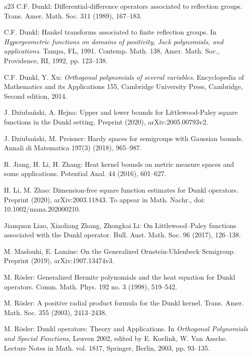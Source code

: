\documentclass[11pt,a4paper]{article}
\theoremstyle{definition}\newtheorem{remark}[theorem]{Remark}
\begin{document}
\begin{thebibliography}{a23}
C.F. Dunkl: Differential-difference operators associated to reflection groups. Trans. Amer. Math. Soc. 311 (1989), 167--183.

C.F. Dunkl: Hankel transforms associated to finite reflection groups. In \emph{Hypergeometric functions on domains of positivity, Jack polynomials, and applications}. Tampa, FL, 1991. Contemp. Math. 138,  Amer. Math. Soc., Providence, RI, 1992, pp. 123--138.

C.F. Dunkl, Y. Xu: \emph{Orthogonal polynomials of several variables}. Encyclopedia of Mathematics and its Applications 155, Cambridge University Press, Cambridge, Second edition, 2014.

J. Dziuba\'{n}ski, A. Hejna: Upper and lower bounds for Littlewood-Paley square functions in the Dunkl setting. Preprint (2020), arXiv:2005.00793v2.

J. Dziuba\'{n}ski, M. Preisner: Hardy spaces for semigroups with Gaussian bounds. Annali di Matematica 197(3) (2018), 965--987.

R. Jiang, H. Li, H. Zhang: Heat kernel bounds on metric measure spaces and some applications. Potential Anal. 44 (2016), 601--627.

H. Li, M. Zhao: Dimension-free square function estimates for Dunkl operators. Preprint (2020), arXiv:2003.11843. To appear in Math. Nachr., doi: 10.1002/mana.202000210.

Jianquan Liao, Xiaoliang Zhang, Zhongkai Li: On Littlewood--Paley functions associated with the Dunkl operator. Bull. Aust. Math. Soc. 96 (2017), 126--138.

M. Maslouhi, E. Lamine: On the Generalized Ornstein-Uhlenbeck Semigroup. Preprint (2019), arXiv:1907.13474v3.

M. R\"{o}sler: Generalized Hermite polynomials and the heat equation for Dunkl operators. Comm. Math. Phys. 192 no. 3 (1998), 519--542.

M. R\"{o}sler: A positive radial product formula for the Dunkl kernel. Trans. Amer. Math. Soc. 355 (2003), 2413--2438.

M. R\"{o}sler: Dunkl operators: Theory and Applications. In \emph{Orthogonal Polynomials and Special Functions}, Leuven 2002, edited by E. Koelink, W. Van Assche. Lecture Notes in Math. vol. 1817, Springer, Berlin, 2003, pp. 93--135.


\end{thebibliography}
\end{document}

